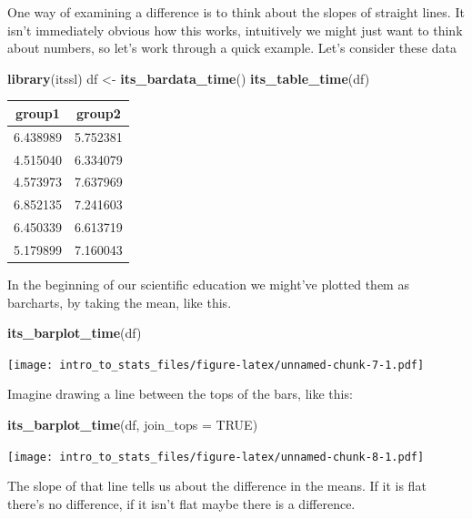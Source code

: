 \documentclass[
]{book}
\newenvironment{Shaded}{\begin{snugshade}}{\end{snugshade}}
\newcommand{\DataTypeTok}[1]{\textcolor[rgb]{0.13,0.29,0.53}{#1}}
\newcommand{\KeywordTok}[1]{\textcolor[rgb]{0.13,0.29,0.53}{\textbf{#1}}}
\newcommand{\NormalTok}[1]{#1}
\newcommand{\OtherTok}[1]{\textcolor[rgb]{0.56,0.35,0.01}{#1}}
\newcommand{\StringTok}[1]{\textcolor[rgb]{0.31,0.60,0.02}{#1}}
\begin{document}
One way of examining a difference is to think about the slopes of straight lines. It isn't immediately obvious how this works, intuitively we might just want to think about numbers, so let's work through a quick example. Let's consider these data

\begin{Shaded}
\begin{Highlighting}[]
\KeywordTok{library}\NormalTok{(itssl)}
\NormalTok{df <-}\StringTok{ }\KeywordTok{its_bardata_time}\NormalTok{()}
\KeywordTok{its_table_time}\NormalTok{(df)}
\end{Highlighting}
\end{Shaded}

\begin{tabular}{c|c}
\hline
group1 & group2\\
\hline
6.438989 & 5.752381\\
\hline
4.515040 & 6.334079\\
\hline
4.573973 & 7.637969\\
\hline
6.852135 & 7.241603\\
\hline
6.450339 & 6.613719\\
\hline
5.179899 & 7.160043\\
\hline
\end{tabular}

In the beginning of our scientific education we might've plotted them as barcharts, by taking the mean, like this.

\begin{Shaded}
\begin{Highlighting}[]
\KeywordTok{its_barplot_time}\NormalTok{(df)}
\end{Highlighting}
\end{Shaded}

\texttt{[image: intro\_to\_stats\_files/figure-latex/unnamed-chunk-7-1.pdf]}

Imagine drawing a line between the tops of the bars, like this:

\begin{Shaded}
\begin{Highlighting}[]
\KeywordTok{its_barplot_time}\NormalTok{(df, }\DataTypeTok{join_tops =} \OtherTok{TRUE}\NormalTok{)}
\end{Highlighting}
\end{Shaded}

\texttt{[image: intro\_to\_stats\_files/figure-latex/unnamed-chunk-8-1.pdf]}

The slope of that line tells us about the difference in the means. If it is flat there's no difference, if it isn't flat maybe there is a difference.
\end{document}
